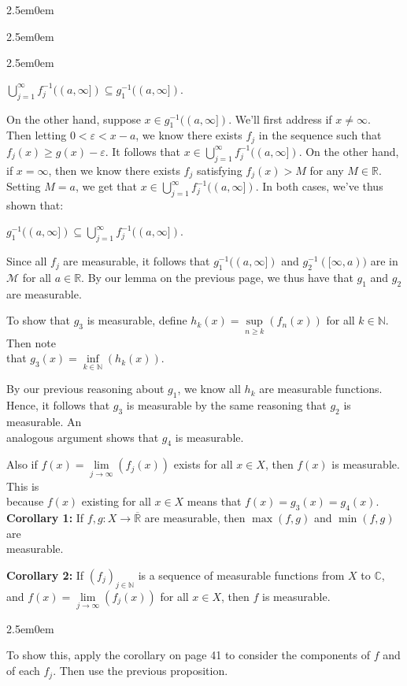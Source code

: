 \documentclass{book}
\newcommand{\hThree}{%
   \color{PineGreen!85!Orange}
   \fontsize{12}{14}\selectfont%
}
\newenvironment{myIndent}{%
   \begin{adjustwidth}{2.5em}{0em}%
}{%
   \end{adjustwidth}%
}
\newcommand{\blab}[1]{\textbf{#1}}
\newcommand{\retTwo}{\hfill\bigbreak}
\begin{document}
\begin{myIndent}
\begin{myIndent}
\begin{myIndent}
         {\centering\phantom{aaaaaaaaaaaaaaaaaaaaaa}$\bigcup\limits_{j=1}^\infty f_j^{-1}((a, \infty]) \subseteq g_1^{-1}((a, \infty])$.\retTwo\par}

         On the other hand, suppose $x \in g_1^{-1}((a, \infty])$. We'll first address if $x \neq \infty$.\\ [5pt] Then letting $0 < \varepsilon < x - a$, we know there exists $f_j$ in the sequence such that $f_j(x) \geq g(x) - \varepsilon$. It follows that $x \in \bigcup\limits_{j=1}^\infty f_j^{-1}((a, \infty])$. On the other hand, if $x = \infty$, then we know there exists $f_j$ satisfying $f_j(x) > M$ for any $M \in \mathbb{R}$. Setting $M = a$, we get that $x \in \bigcup\limits_{j=1}^\infty f_j^{-1}((a, \infty])$. In both cases, we've thus shown that:

         {\centering $g_1^{-1}((a, \infty]) \subseteq \bigcup\limits_{j=1}^\infty f_j^{-1}((a, \infty])$. \retTwo\par}
      \end{myIndent}

      Since all $f_j$ are measurable, it follows that $g_1^{-1}((a, \infty])$ and $g_2^{-1}([\infty, a))$ are in $\mathcal{M}$ for all $a \in \mathbb{R}$. By our lemma on the previous page, we thus have that $g_1$ and $g_2$ are measurable.\retTwo

      To show that $g_3$ is measurable, define $h_k(x) = \sup\limits_{n \geq k}(f_n(x))$ for all $k \in \mathbb{N}$. Then note\\ [-6pt] that $g_3(x) = \inf\limits_{k \in \mathbb{N}}(h_k(x))$.\retTwo

      By our previous reasoning about $g_1$, we know all $h_k$ are measurable functions. Hence, it follows that $g_3$ is measurable by the same reasoning that $g_2$ is measurable. An\\ analogous argument shows that $g_4$ is measurable.\retTwo
   \end{myIndent}

   Also if $f(x) = \lim\limits_{j \rightarrow \infty} (f_j(x))$ exists for all $x \in X$, then $f(x)$ is measurable. This is\\ because $f(x)$ existing for all $x \in X$ means that $f(x) = g_3(x) = g_4(x)$.\\ [8pt]

   \blab{Corollary 1:} If $f, g: X \longrightarrow \overline{\mathbb{R}}$ are measurable, then $\max(f, g)$ and $\min(f, g)$ are\\ measurable.\retTwo

   \blab{Corollary 2:} If $(f_j)_{j \in \mathbb{N}}$ is a sequence of measurable functions from $X$ to $\mathbb{C}$, and $f(x) = \lim\limits_{j \rightarrow \infty}(f_j(x))$ for all $x \in X$, then $f$ is measurable.

   \begin{myIndent}\hThree
      To show this, apply the corollary on page 41 to consider the components of $f$ and of each $f_j$. Then use the previous proposition.\retTwo
   \end{myIndent}
\end{myIndent}
\end{document}
